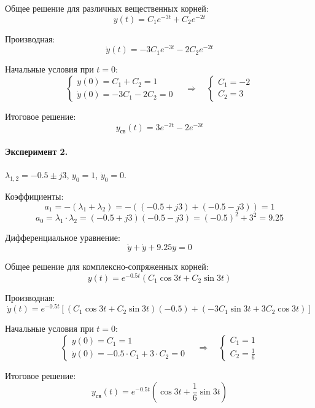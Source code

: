 \documentclass[14pt,a4paper]{extarticle}
\begin{document}
Общее решение для различных вещественных корней:
\[
  y(t) = C_1 e^{-3t} + C_2 e^{-2t}
\]

Производная:
\[
  \dot y(t) = -3C_1 e^{-3t} - 2C_2 e^{-2t}
\]

Начальные условия при $t = 0$:
\[
  \begin{cases}
    y(0) = C_1 + C_2 = 1 \\
    \dot y(0) = -3C_1 - 2C_2 = 0
  \end{cases}
  \quad\Rightarrow\quad
  \begin{cases}
    C_1 = -2 \\
    C_2 = 3
  \end{cases}
\]

Итоговое решение:
\begin{equation}
  y_{\text{св}}(t) = 3e^{-2t} - 2e^{-3t}
\end{equation}


\paragraph{Эксперимент 2.} $\lambda_{1,2}=-0.5\pm j3$, $y_0=1$, $\dot y_0=0$.

Коэффициенты:
\[
  a_1 = -(\lambda_1 + \lambda_2) = -((-0.5 + j3) + (-0.5 - j3)) = 1
\]
\[
  a_0 = \lambda_1 \cdot \lambda_2 = (-0.5 + j3)(-0.5 - j3) = (-0.5)^2 + 3^2 = 9.25
\]

Дифференциальное уравнение:
\begin{equation}
  \ddot y + \dot y + 9.25y = 0
\end{equation}

Общее решение для комплексно-сопряженных корней:
\[
  y(t) = e^{-0.5t}(C_1 \cos 3t + C_2 \sin 3t)
\]

Производная:
\[
  \dot y(t) = e^{-0.5t}\left[(C_1 \cos 3t + C_2 \sin 3t)(-0.5) + (-3C_1 \sin 3t + 3C_2 \cos 3t)\right]
\]

Начальные условия при $t = 0$:
\[
  \begin{cases}
    y(0) = C_1 = 1 \\
    \dot y(0) = -0.5 \cdot C_1 + 3 \cdot C_2 = 0
  \end{cases}
  \quad\Rightarrow\quad
  \begin{cases}
    C_1 = 1 \\
    C_2 = \frac{1}{6}
  \end{cases}
\]

Итоговое решение:
\begin{equation}
  y_{\text{св}}(t) = e^{-0.5t}\left(\cos 3t + \frac{1}{6}\sin 3t\right)
\end{equation}
\end{document}
